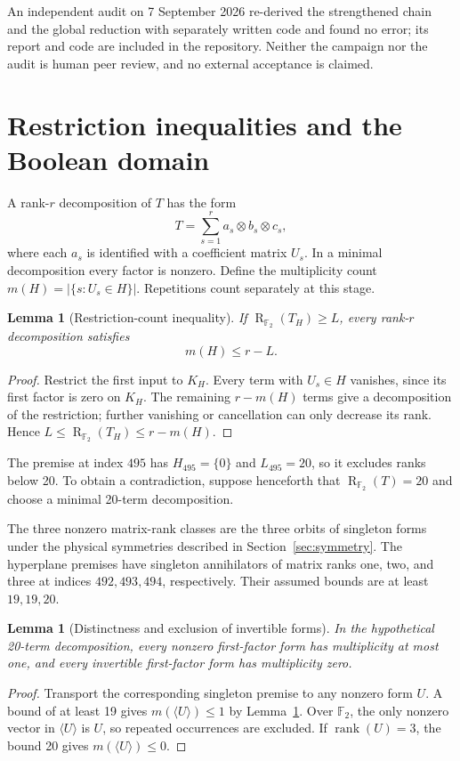 \documentclass[11pt]{article}
\newcommand{\F}{\mathbb F_2}
\newcommand{\rk}{\operatorname{rank}}
\newcommand{\R}{\operatorname{R}_{\F}}
\newtheorem{lemma}[theorem]{Lemma}
\theoremstyle{definition}
\begin{document}
An independent audit on 7 September 2026 re-derived the strengthened chain and the global reduction with separately written code and found no error; its report and code are included in the repository. Neither the campaign nor the audit is human peer review, and no external acceptance is claimed.

\section{Restriction inequalities and the Boolean domain}
A rank-$r$ decomposition of $T$ has the form
\begin{equation}\label{eq:decomp}
 T=\sum_{s=1}^{r} a_s\otimes b_s\otimes c_s,
\end{equation}
where each $a_s$ is identified with a coefficient matrix $U_s$. In a minimal decomposition every factor is nonzero. Define the multiplicity count
$m(H)=|\{s:U_s\in H\}|$. Repetitions count separately at this stage.

\begin{lemma}[Restriction-count inequality]\label{lem:count}
If $\R(T_H)\geq L$, every rank-$r$ decomposition satisfies
\begin{equation}\label{eq:count}
 m(H)\leq r-L.
\end{equation}
\end{lemma}
\begin{proof}
Restrict the first input to $K_H$. Every term with $U_s\in H$ vanishes, since its first factor is zero on $K_H$. The remaining $r-m(H)$ terms give a decomposition of the restriction; further vanishing or cancellation can only decrease its rank. Hence $L\leq\R(T_H)\leq r-m(H)$.
\end{proof}

The premise at index $495$ has $H_{495}=\{0\}$ and $L_{495}=20$, so it excludes ranks below 20. To obtain a contradiction, suppose henceforth that $\R(T)=20$ and choose a minimal 20-term decomposition.

The three nonzero matrix-rank classes are the three orbits of singleton forms under the physical symmetries described in Section~\ref{sec:symmetry}. The hyperplane premises have singleton annihilators of matrix ranks one, two, and three at indices $492,493,494$, respectively. Their assumed bounds are at least $19,19,20$.

\begin{lemma}[Distinctness and exclusion of invertible forms]\label{lem:binary}
In the hypothetical 20-term decomposition, every nonzero first-factor form has multiplicity at most one, and every invertible first-factor form has multiplicity zero.
\end{lemma}
\begin{proof}
Transport the corresponding singleton premise to any nonzero form $U$. A bound of at least 19 gives $m(\langle U\rangle)\leq1$ by Lemma~\ref{lem:count}. Over $\F$, the only nonzero vector in $\langle U\rangle$ is $U$, so repeated occurrences are excluded. If $\rk(U)=3$, the bound 20 gives $m(\langle U\rangle)\leq0$.
\end{proof}
\end{document}
